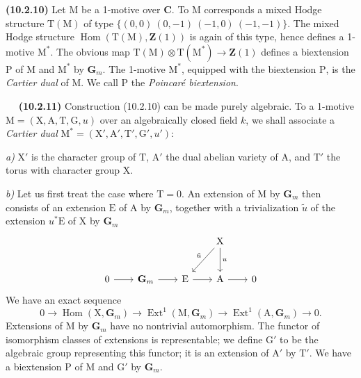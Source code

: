 \documentclass[11pt,leqno]{article}
\newcommand{\Page}[1]{\ifvmode\noindent\else\unskip\ \fi{\footnotesize\textcolor{gray}{[p.\,#1]}}\ \ignorespaces}
\begin{document}
\textbf{(10.2.10)} Let \(\mathrm{M}\) be a 1-motive over
\(\mathbf{C}\). To \(\mathrm{M}\) corresponds a mixed Hodge
structure \(\mathrm{T}(\mathrm{M})\) of type
\(\{(0,0)\ (0,-1)\ (-1,0)\ (-1,-1)\}\).
The mixed Hodge structure
\(\operatorname{Hom}(\mathrm{T}(\mathrm{M}),\mathbf{Z}(1))\)
is again of this type, hence defines a 1-motive \(\mathrm{M}^{*}\).
The obvious map
\(\mathrm{T}(\mathrm{M})\otimes\mathrm{T}(\mathrm{M}^{*})
\to\mathbf{Z}(1)\) defines a biextension \(\mathrm{P}\) of
\(\mathrm{M}\) and \(\mathrm{M}^{*}\) by \(\mathbf{G}_m\).
The 1-motive \(\mathrm{M}^{*}\), equipped with the biextension
\(\mathrm{P}\), is the \textit{Cartier dual} of \(\mathrm{M}\).
We call \(\mathrm{P}\) the \textit{Poincaré biextension}.

\Page{67}
\textbf{(10.2.11)} Construction (10.2.10) can be made
purely algebraic. To a 1-motive
\(\mathrm{M}=(\mathrm{X},\mathrm{A},\mathrm{T},\mathrm{G},u)\)
over an algebraically closed field \(k\), we shall associate
a \textit{Cartier dual}
\(\mathrm{M}^{*}=(\mathrm{X}',\mathrm{A}',\mathrm{T}',
\mathrm{G}',u')\):

\textit{a)} \(\mathrm{X}'\) is the character group of
\(\mathrm{T}\), \(\mathrm{A}'\) the dual abelian variety of
\(\mathrm{A}\), and \(\mathrm{T}'\) the torus with character
group \(\mathrm{X}\).

\textit{b)} Let us first treat the case where \(\mathrm{T}=0\).
An extension of \(\mathrm{M}\) by \(\mathbf{G}_m\) then consists
of an extension \(\mathrm{E}\) of \(\mathrm{A}\) by
\(\mathbf{G}_m\), together with a trivialization \(\tilde{u}\) of
the extension \(u^{*}\mathrm{E}\) of \(\mathrm{X}\) by
\(\mathbf{G}_m\)
\[
\begin{tikzcd}[row sep=2.5em, column sep=2em]
&&& \mathrm{X} \arrow[dl, "\tilde{u}"'] \arrow[d, "u"] &\\
0 \arrow[r] & \mathbf{G}_m \arrow[r] &
\mathrm{E} \arrow[r] & \mathrm{A} \arrow[r] & 0
\end{tikzcd}
\]
We have an exact sequence
\[
0\to\operatorname{Hom}(\mathrm{X},\mathbf{G}_m)
\to\operatorname{Ext}^{1}(\mathrm{M},\mathbf{G}_m)
\to\operatorname{Ext}^{1}(\mathrm{A},\mathbf{G}_m)\to0.
\]
Extensions of \(\mathrm{M}\) by \(\mathbf{G}_m\) have
no nontrivial automorphism. The functor of isomorphism
classes of extensions is representable; we define
\(\mathrm{G}'\) to be the algebraic group representing
this functor; it is an extension of \(\mathrm{A}'\) by
\(\mathrm{T}'\). We have a biextension \(\mathrm{P}\)
of \(\mathrm{M}\) and \(\mathrm{G}'\) by \(\mathbf{G}_m\).
\end{document}

